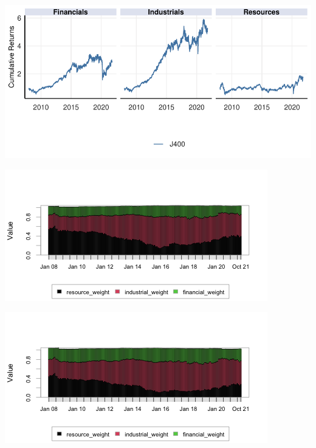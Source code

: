 \documentclass[11pt,preprint, authoryear]{elsarticle}
\let\origfigure\figure
\let\endorigfigure\endfigure
\renewenvironment{figure}[1][2] {
    \expandafter\origfigure\expandafter[H]
} {
    \endorigfigure
}
\numberwithin{equation}{section}
\numberwithin{figure}{section}
\numberwithin{table}{section}
\begin{document}
\begin{figure}[H]

{\centering \includegraphics{Paper_files/figure-latex/CumRet-1} 

}

\caption{Cumulative Returns per Sector for ALSI and SWIX \label{CumRet}}\label{fig:CumRet}
\end{figure}

\begin{figure}[H]

{\centering \includegraphics{Paper_files/figure-latex/ALSI-1} 

}

\caption{ALSI Weight Contribution \label{ALSI}}\label{fig:ALSI}
\end{figure}

\begin{figure}[H]

{\centering \includegraphics{Paper_files/figure-latex/SWIX-1} 

}

\caption{SWIX Weight Contribution \label{SWIX}}\label{fig:SWIX}
\end{figure}
\end{document}
